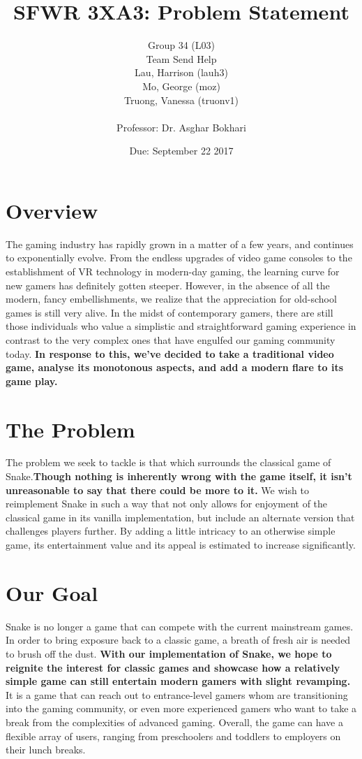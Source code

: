 \documentclass[12pt, titlepage]{article}
\title{SFWR 3XA3: Problem Statement}
\author{Group 34 (L03) \\ Team Send Help
\\ Lau, Harrison (lauh3) \\ Mo, George (moz) \\ Truong, Vanessa (truonv1)
\\
\\ Professor: Dr. Asghar Bokhari}
\date{Due: September 22 2017}
\begin{document}
\maketitle
\newpage


\tableofcontents
\newpage




\section {Overview}
The gaming industry has rapidly grown in a matter of a few years, and continues to exponentially evolve. From the endless upgrades of video game consoles to the establishment of VR technology in modern-day gaming, the learning curve for new gamers has definitely gotten steeper. However, in the absence of all the modern, fancy embellishments, we realize that the appreciation for old-school games is still very alive. In the midst of contemporary gamers, there are still those individuals who value a simplistic and straightforward gaming experience in contrast to the very complex ones that have engulfed our gaming community today. \textbf{In response to this, we've decided to take a traditional video game, analyse its monotonous aspects, and add a modern flare to its game play.}

\section {The Problem}
The problem we seek to tackle is that which surrounds the classical game of Snake.\textbf{Though nothing is inherently wrong with the game itself, it isn't unreasonable to say that there could be more to it.} We wish to reimplement Snake in such a way that not only allows for enjoyment of the classical game in its vanilla implementation, but include an alternate version that challenges players further. By adding a little intricacy to an otherwise simple game, its entertainment value and its appeal is estimated to increase significantly.

\section {Our Goal}
Snake is no longer a game that can compete with the current mainstream games. In order to bring exposure back to a classic game, a breath of fresh air is needed to brush off the dust. \textbf{With our implementation of Snake, we hope to reignite the interest for classic games and showcase how a relatively simple game can still entertain modern gamers with slight revamping.} It is a game that can reach out to entrance-level gamers whom are transitioning into the gaming community, or even more experienced gamers who want to take a break from the complexities of advanced gaming. Overall, the game can have a flexible array of users, ranging from preschoolers and toddlers to employers on their lunch breaks.
\end{document}
